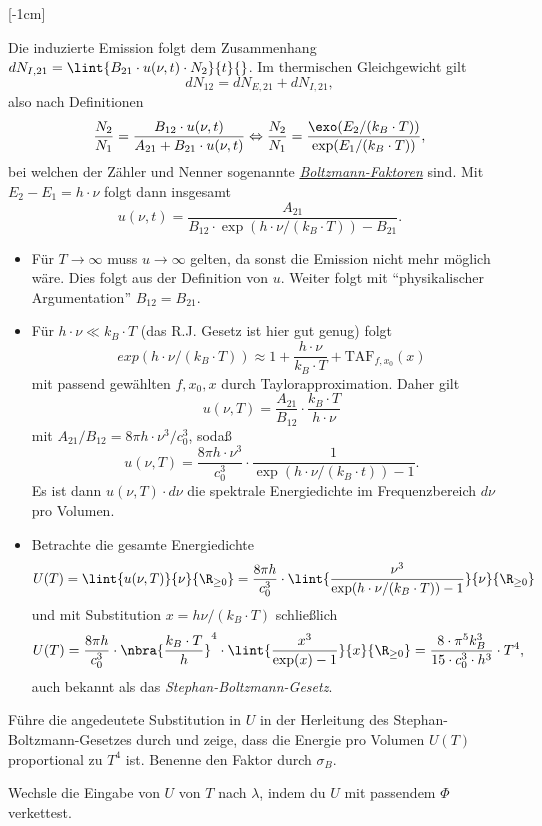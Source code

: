 \documentclass{article}
\begin{document}
    [-1cm]

    Die induzierte Emission folgt dem Zusammenhang $dN_{I,21} = \lint{B_{21}\cdot u(\nu, t)\cdot N_2}{t}{}$. Im thermischen Gleichgewicht gilt
    \[dN_{12} = dN_{E,21} + dN_{I,21},\]
    also nach Definitionen 
    \[\frac{N_2}{N_1} = \frac{B_{12}\cdot u(\nu,t)}{A_{21} + B_{21}\cdot u(\nu,t)} \Leftrightarrow \frac{N_2}{N_1} = \frac{\exo(E_2/(k_B\cdot T))}{\exp(E_1/(k_B\cdot T))},\]
    bei welchen der Zähler und Nenner sogenannte \href{https://de.wikipedia.org/wiki/Boltzmann-Statistik}{\emph{Boltzmann-Faktoren}} sind. Mit $E_2-E_1 = h\cdot\nu$ folgt dann insgesamt 
    \[u(\nu,t) = \frac{A_{21}}{B_{12}\cdot\exp(h\cdot\nu/(k_B\cdot T)) - B_{21}}.\]

    \begin{itemize}
        \item Für $T\to\infty$ muss $u\to\infty$ gelten, da sonst die Emission nicht mehr möglich wäre. Dies folgt aus der Definition von $u$. Weiter folgt mit \enquote{physikalischer Argumentation} $B_{12} = B_{21}$.
        \item Für $h\cdot\nu \ll k_B\cdot T$ (das R.J. Gesetz ist hier gut genug) folgt 
        \[exp(h\cdot\nu / (k_B\cdot T))\approx 1+\frac{h\cdot\nu}{k_B\cdot T}+\text{TAF}_{f,x_0}(x)\]
        mit passend gewählten $f,x_0,x$ durch Taylorapproximation. Daher gilt
        \[u(\nu,T) = \frac{A_{21}}{B_{12}}\cdot\frac{k_B\cdot T}{h\cdot\nu}\]
        mit $A_{21}/B_{12} = 8\pi h\cdot\nu^3/c_0^3$, sodaß 
        \[u(\nu,T) = \frac{8\pi h\cdot\nu^3}{c_0^3} \cdot\frac{1}{\exp(h\cdot\nu /(k_B\cdot t)) - 1}.\]
        Es ist dann $u(\nu,T) \cdot d\nu$ die spektrale Energiedichte im Frequenzbereich $d\nu$ pro Volumen. 
        \item Betrachte die gesamte Energiedichte 
        \[U(T) = \lint{u(\nu,T)}{\nu}{\R_{\geq 0}} = \frac{8\pi h}{c_0^3}\cdot\lint{\frac{\nu^3}{\exp(h\cdot\nu/(k_B\cdot T)) - 1}}{\nu}{\R_{\geq 0}}\]
        und mit Substitution $x = h\nu / (k_B\cdot T)$ schließlich 
        \[U(T) = \frac{8\pi h}{c_0^3} \cdot\nbra{\frac{k_B\cdot T}{h}}^4\cdot\lint{\frac{x^3}{\exp(x)-1}}{x}{\R_{\geq 0}} = \frac{8\cdot\pi^5 k_B^3}{15\cdot c_0^3\cdot h^3}\cdot T^4,\]
        auch bekannt als das \emph{Stephan-Boltzmann-Gesetz}.
    \end{itemize}
    \begin{Aufgabe}
        \nr{} Führe die angedeutete Substitution in $U$ in der Herleitung des Stephan-Boltzmann-Gesetzes durch und zeige, dass die Energie pro Volumen $U(T)$ proportional zu $T^4$ ist. Benenne den Faktor durch $\sigma_B$. 
        
        \nr{} Wechsle die Eingabe von $U$ von $T$ nach $\lambda$, indem du $U$ mit passendem $\Phi$ verkettest.
    \end{Aufgabe}
\end{document}
